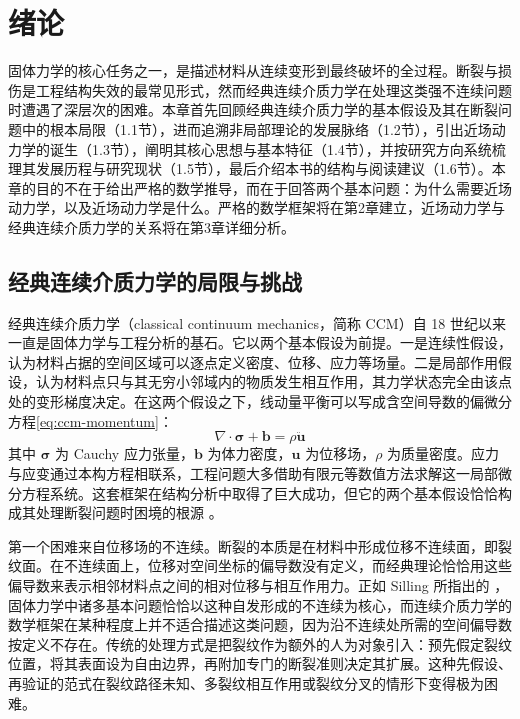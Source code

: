 \chapter{绪论}

\leavevmode\usetikzlibrary{arrows.meta, positioning, calc, decorations.pathmorphing, shapes.geometric}

固体力学的核心任务之一，是描述材料从连续变形到最终破坏的全过程。断裂与损伤是工程结构失效的最常见形式，然而经典连续介质力学在处理这类强不连续问题时遭遇了深层次的困难。本章首先回顾经典连续介质力学的基本假设及其在断裂问题中的根本局限（1.1节），进而追溯非局部理论的发展脉络（1.2节），引出近场动力学的诞生（1.3节），阐明其核心思想与基本特征（1.4节），并按研究方向系统梳理其发展历程与研究现状（1.5节），最后介绍本书的结构与阅读建议（1.6节）。本章的目的不在于给出严格的数学推导，而在于回答两个基本问题：为什么需要近场动力学，以及近场动力学是什么。严格的数学框架将在第2章建立，近场动力学与经典连续介质力学的关系将在第3章详细分析。

\section{经典连续介质力学的局限与挑战}

经典连续介质力学（classical continuum mechanics，简称 CCM）自 18 世纪以来一直是固体力学与工程分析的基石。它以两个基本假设为前提。一是连续性假设，认为材料占据的空间区域可以逐点定义密度、位移、应力等场量。二是局部作用假设，认为材料点只与其无穷小邻域内的物质发生相互作用，其力学状态完全由该点处的变形梯度决定。在这两个假设之下，线动量平衡可以写成含空间导数的偏微分方程\eqref{eq:ccm-momentum}：
\begin{equation}
  \nabla\cdot\boldsymbol{\sigma}+\mathbf{b}=\rho\ddot{\mathbf{u}}
  \label{eq:ccm-momentum}
\end{equation}
其中 $\boldsymbol{\sigma}$ 为 Cauchy 应力张量，$\mathbf{b}$ 为体力密度，$\mathbf{u}$ 为位移场，$\rho$ 为质量密度。应力与应变通过本构方程相联系，工程问题大多借助有限元等数值方法求解这一局部微分方程系统。这套框架在结构分析中取得了巨大成功，但它的两个基本假设恰恰构成其处理断裂问题时困境的根源 \cite{Silling2000}。

第一个困难来自位移场的不连续。断裂的本质是在材料中形成位移不连续面，即裂纹面。在不连续面上，位移对空间坐标的偏导数没有定义，而经典理论恰恰用这些偏导数来表示相邻材料点之间的相对位移与相互作用力。正如 Silling 所指出的 \cite{Silling2000}，固体力学中诸多基本问题恰恰以这种自发形成的不连续为核心，而连续介质力学的数学框架在某种程度上并不适合描述这类问题，因为沿不连续处所需的空间偏导数按定义不存在。传统的处理方式是把裂纹作为额外的人为对象引入：预先假定裂纹位置，将其表面设为自由边界，再附加专门的断裂准则决定其扩展。这种先假设、再验证的范式在裂纹路径未知、多裂纹相互作用或裂纹分叉的情形下变得极为困难。

